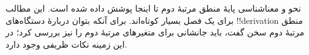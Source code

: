 \documentclass[../../../include/open-logic-chapter]{subfiles}
\begin{document}

\begin{editorial}
نحو و معناشناسی پایهٔ منطق مرتبهٔ دوم تا اینجا پوشش داده شده است. این
مطالب برای یک فصل بسیار کوتاه‌اند. برای آنکه بتوان دربارهٔ دستگاه‌های
!!{derivation} منطق مرتبهٔ دوم سخن گفت، باید جانشانی برای متغیرهای
مرتبهٔ دوم را نیز بررسی کرد؛ در این زمینه نکات ظریفی وجود دارد.
\end{editorial}







\OLEndChapterHook
\end{document}
